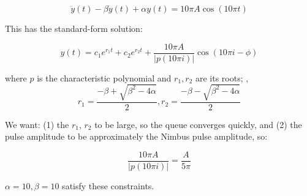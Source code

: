 \begin{Appendix}
\begin{equation}
    \ddot{y}(t) - \beta \dot{y}(t) + \alpha y(t) = 10\pi{}A \cos(10\pi{}t)
\end{equation}

    \noindent This has the standard-form solution:

\begin{equation}
    y(t) = c_1 e^{r_1 t} + c_2 e^{r_2 t} + \frac{10\pi{}A}{|p(10\pi{}i)|} \cos(10\pi{}i - \phi)
\end{equation}
        
where $p$ is the characteristic polynomial and $r_1, r_2$ are its roots;
\ie, 
\begin{equation}
r_1 = \frac{-\beta + \sqrt{\beta^2 - 4\alpha}}{2}, r_2 = \frac{-\beta - \sqrt{\beta^2 - 4\alpha}}{2}
\end{equation}

\noindent We want: (1) the $r_1$, $r_2$ to be large, so the queue converges quickly, and (2) the pulse amplitude to be approximately the Nimbus pulse amplitude, so:

\begin{equation}
\frac{10\pi{}A}{|p(10\pi{}i)|} = \frac{A}{5\pi}
\end{equation}

$\alpha = 10, \beta = 10$ satisfy these constraints.
\end{Appendix}




